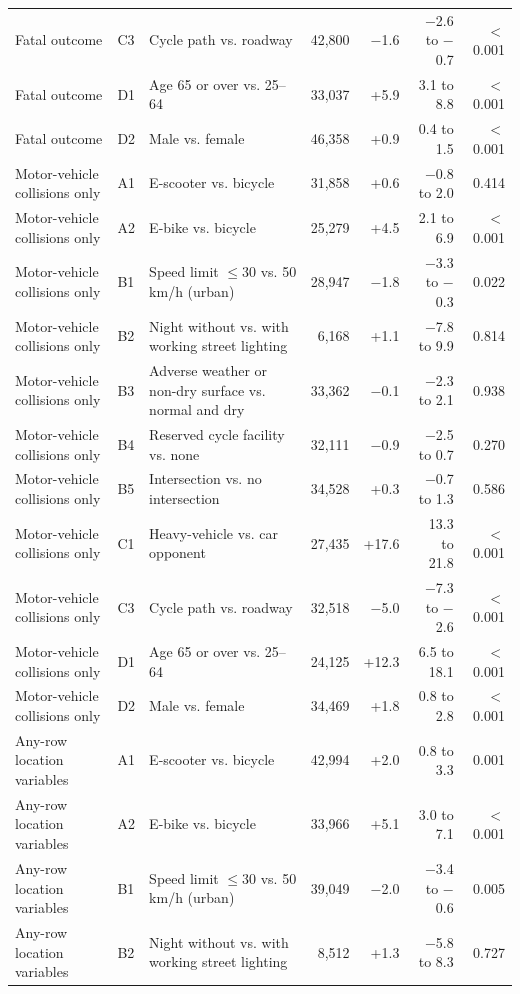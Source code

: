 \begin{table}[tp]
\begin{threeparttable}
{\begin{tabular}{p{4.6cm}lp{4.4cm}rrrr}
Fatal outcome & C3 & Cycle path vs. roadway & 42,800 & $-$1.6 & $-$2.6 to $-$0.7 & $<$0.001 \\
Fatal outcome & D1 & Age 65 or over vs. 25–64 & 33,037 & +5.9 & 3.1 to 8.8 & $<$0.001 \\
Fatal outcome & D2 & Male vs. female & 46,358 & +0.9 & 0.4 to 1.5 & $<$0.001 \\
Motor-vehicle collisions only & A1 & E-scooter vs. bicycle & 31,858 & +0.6 & $-$0.8 to 2.0 & 0.414 \\
Motor-vehicle collisions only & A2 & E-bike vs. bicycle & 25,279 & +4.5 & 2.1 to 6.9 & $<$0.001 \\
Motor-vehicle collisions only & B1 & Speed limit $\leq$30 vs. 50 km/h (urban) & 28,947 & $-$1.8 & $-$3.3 to $-$0.3 & 0.022 \\
Motor-vehicle collisions only & B2 & Night without vs. with working street lighting & 6,168 & +1.1 & $-$7.8 to 9.9 & 0.814 \\
Motor-vehicle collisions only & B3 & Adverse weather or non-dry surface vs. normal and dry & 33,362 & $-$0.1 & $-$2.3 to 2.1 & 0.938 \\
Motor-vehicle collisions only & B4 & Reserved cycle facility vs. none & 32,111 & $-$0.9 & $-$2.5 to 0.7 & 0.270 \\
Motor-vehicle collisions only & B5 & Intersection vs. no intersection & 34,528 & +0.3 & $-$0.7 to 1.3 & 0.586 \\
Motor-vehicle collisions only & C1 & Heavy-vehicle vs. car opponent & 27,435 & +17.6 & 13.3 to 21.8 & $<$0.001 \\
Motor-vehicle collisions only & C3 & Cycle path vs. roadway & 32,518 & $-$5.0 & $-$7.3 to $-$2.6 & $<$0.001 \\
Motor-vehicle collisions only & D1 & Age 65 or over vs. 25–64 & 24,125 & +12.3 & 6.5 to 18.1 & $<$0.001 \\
Motor-vehicle collisions only & D2 & Male vs. female & 34,469 & +1.8 & 0.8 to 2.8 & $<$0.001 \\
Any-row location variables & A1 & E-scooter vs. bicycle & 42,994 & +2.0 & 0.8 to 3.3 & 0.001 \\
Any-row location variables & A2 & E-bike vs. bicycle & 33,966 & +5.1 & 3.0 to 7.1 & $<$0.001 \\
Any-row location variables & B1 & Speed limit $\leq$30 vs. 50 km/h (urban) & 39,049 & $-$2.0 & $-$3.4 to $-$0.6 & 0.005 \\
Any-row location variables & B2 & Night without vs. with working street lighting & 8,512 & +1.3 & $-$5.8 to 8.3 & 0.727 \\

\end{tabular}}
\end{threeparttable}
\end{table}
